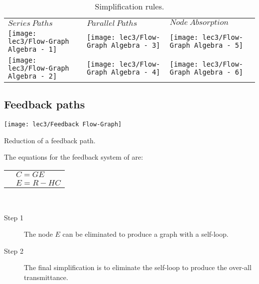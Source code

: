 
\vspace{-0.01cm}
\begin{table}[!h]
	\begin{tabular}{>{\centering\arraybackslash}m{3.5cm} | >{\centering\arraybackslash}m{3.5cm} | >{\centering\arraybackslash}m{3.5cm}}
	       \small $Series\ Paths$ &\small $Parallel\ Paths$ &\small $Node\ Absorption$\\[+1mm]
	       \texttt{[image: lec3/Flow-Graph Algebra - 1]}&
	       \texttt{[image: lec3/Flow-Graph Algebra - 3]}&
	       \texttt{[image: lec3/Flow-Graph Algebra - 5]}\\
	       \texttt{[image: lec3/Flow-Graph Algebra - 2]}&
	       \texttt{[image: lec3/Flow-Graph Algebra - 4]}&
	       \texttt{[image: lec3/Flow-Graph Algebra - 6]}\\
	\end{tabular}
	\caption{Simplification rules.}
\end{table}

\pagebreak
\justify
\subsection{Feedback paths}

\begin{marginfigure}[-0.4233401538135892cm]
		\texttt{[image: lec3/Feedback Flow-Graph]}
		\caption{Reduction of a feedback path.}
\end{marginfigure}

The equations for the feedback system of  are:\\
\begin{tabular}{p{8cm}p{2cm}}
	&$C=GE$\\
	&$E=R-HC$\\
\end{tabular}
\\
\begin{description}
	\item[Step 1]  The node $E$ can be eliminated to produce a graph with a self-loop.\\[+2.65em]
	\item[Step 2]  The final simplification is to eliminate the self-loop to produce the over-all transmittance.
\end{description}


